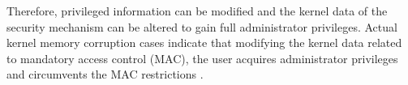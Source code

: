 %
Therefore, privileged information can be modified and the kernel data of the security
mechanism can be altered to gain full administrator privileges.
%
Actual kernel memory corruption cases indicate that modifying the kernel data
related to mandatory access control (MAC), the user acquires administrator
privileges and circumvents the MAC restrictions \cite{nexus5exploit,grsecurity}.


%


